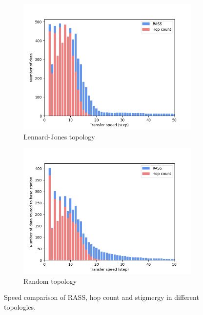 \begin{figure}
\begin{subfigure}{0.48\textwidth}
        \includegraphics[width=\textwidth]{figures/dora_mesh/lennard_speed.png}
        \caption{Lennard-Jones topology}
        \label{results:lennard_100_speed}
    \end{subfigure}
    \begin{subfigure}{0.48\textwidth}
        \includegraphics[width=\textwidth]{figures/dora_mesh/random_speed.png}
        \caption{Random topology}
        \label{results:random_100_speed}
    \end{subfigure}
    \caption[RASS transfer speeds]{Speed comparison of \ac{RASS}, hop count and stigmergy in different topologies.}
    \label{results:rass_speed}
\end{figure}

